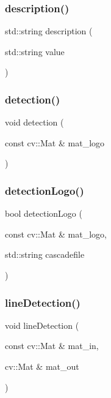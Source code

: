 \mbox{\label{group__coreh_gaad0390ab7aa8f0cac1eee4492e919baf}} 
\subsubsection{\texorpdfstring{description()}{description()}}
{\footnotesize\ttfamily std\+::string description (\begin{DoxyParamCaption}\item[{std\+::string}]{value }\end{DoxyParamCaption})}

\mbox{\label{group__coreh_ga0ef39a5ada0921b3abf8906957746b86}} 
\subsubsection{\texorpdfstring{detection()}{detection()}}
{\footnotesize\ttfamily void detection (\begin{DoxyParamCaption}\item[{const cv\+::\+Mat \&}]{mat\+\_\+logo }\end{DoxyParamCaption})}

\mbox{\label{group__coreh_gad1ae53e92ff9edcee7a9f35d2956ae57}} 
\subsubsection{\texorpdfstring{detection\+Logo()}{detectionLogo()}}
{\footnotesize\ttfamily bool detection\+Logo (\begin{DoxyParamCaption}\item[{const cv\+::\+Mat \&}]{mat\+\_\+logo,  }\item[{std\+::string}]{cascadefile }\end{DoxyParamCaption})}

\mbox{\label{group__coreh_gaa7c37c22318217cd913a50800eb336a3}} 
\subsubsection{\texorpdfstring{line\+Detection()}{lineDetection()}}
{\footnotesize\ttfamily void line\+Detection (\begin{DoxyParamCaption}\item[{const cv\+::\+Mat \&}]{mat\+\_\+in,  }\item[{cv\+::\+Mat \&}]{mat\+\_\+out }\end{DoxyParamCaption})}

